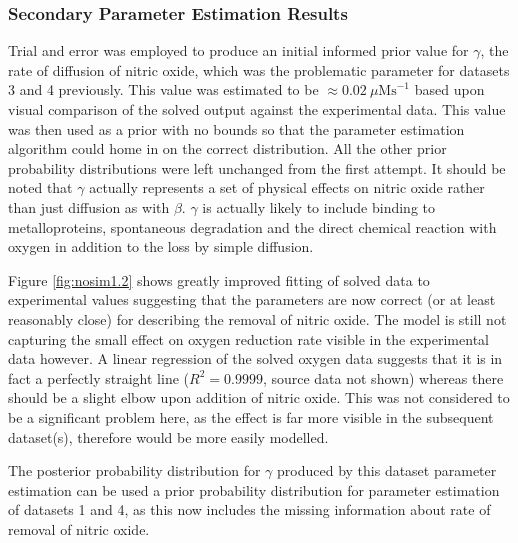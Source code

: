\subsubsection{Secondary Parameter Estimation Results}
Trial and error was employed to produce an initial informed prior value for $\gamma$, the rate of diffusion of nitric oxide, which was the problematic parameter for datasets 3 and 4 previously. This value was estimated to be $\approx 0.02~\mu \mathrm{Ms}^{-1}$ based upon visual comparison of the solved output against the experimental data. This value was then used as a prior with no bounds so that the parameter estimation algorithm could home in on the correct distribution. All the other prior probability distributions were left unchanged from the first attempt. It should be noted that $\gamma$ actually represents a set of physical effects on nitric oxide rather than just diffusion as with $\beta$. $\gamma$ is actually likely to include binding to metalloproteins, spontaneous degradation and the direct chemical reaction with oxygen in addition to the loss by simple diffusion.

Figure \ref{fig:nosim1.2} shows greatly improved fitting of solved data to experimental values suggesting that the parameters are now correct (or at least reasonably close) for describing the removal of nitric oxide. The model is still not capturing the small effect on oxygen reduction rate visible in the experimental data however. A linear regression of the solved oxygen data suggests that it is in fact a perfectly straight line ($R^2=0.9999$, source data not shown) whereas there should be a slight elbow upon addition of nitric oxide. This was not considered to be a significant problem here, as the effect is far more visible in the subsequent dataset(s), therefore would be more easily modelled.

The posterior probability distribution for $\gamma$ produced by this dataset parameter estimation can be used a prior probability distribution for parameter estimation of datasets 1 and 4, as this now includes the missing information about rate of removal of nitric oxide.

